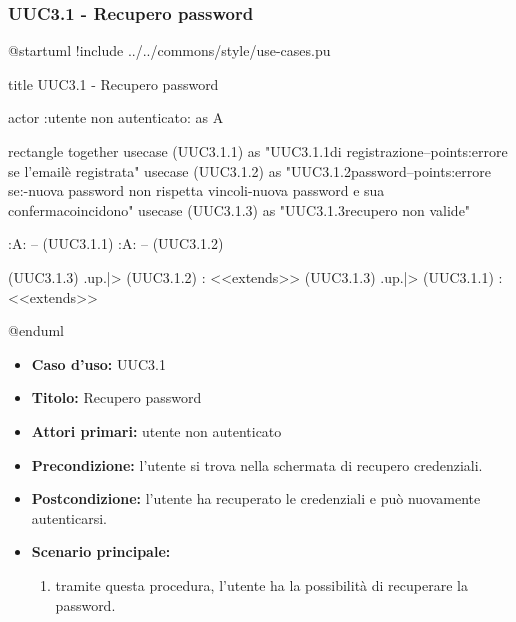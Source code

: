 \documentclass[casi-duso]{subfiles}
\begin{document}
\subsubsection{UUC3.1 - Recupero password}%
\label{subsub:UUC3.1utente}

\begin{plantuml}
@startuml
!include ../../commons/style/use-cases.pu

title UUC3.1 - Recupero password

actor :utente non autenticato: as A

rectangle {
  together {
    usecase (UUC3.1.1) as "UUC3.1.1\nInserimento\nemail di registrazione\n--\nExtension points:\nVisualizzazione errore se l'email\nnon è registrata"
    usecase (UUC3.1.2) as "UUC3.1.2\nReimpostazione password\n--\nExtension points:\nVisualizzazione errore se:\n-nuova password non rispetta vincoli\n-nuova password e sua conferma\nnon coincidono"  
    usecase (UUC3.1.3) as "UUC3.1.3\nInformazioni recupero non valide" 
  }
}

:A: -- (UUC3.1.1)
:A: -- (UUC3.1.2)

(UUC3.1.3) .up.|> (UUC3.1.2) : <<extends>>
(UUC3.1.3) .up.|> (UUC3.1.1) : <<extends>>

@enduml  
\end{plantuml}

\begin{itemize}
  \item \textbf{Caso d’uso:} UUC3.1
  \item \textbf{Titolo:} Recupero password
  \item \textbf{Attori primari:} utente non autenticato
  \item \textbf{Precondizione:} l'utente si trova nella schermata di recupero credenziali.
  \item \textbf{Postcondizione:} l'utente ha recuperato le credenziali e può nuovamente autenticarsi.
  \item \textbf{Scenario principale:}
        \begin{enumerate}
          \item tramite questa procedura, l'utente ha la possibilità di recuperare la password.
        \end{enumerate}
\end{itemize}

\end{document}
